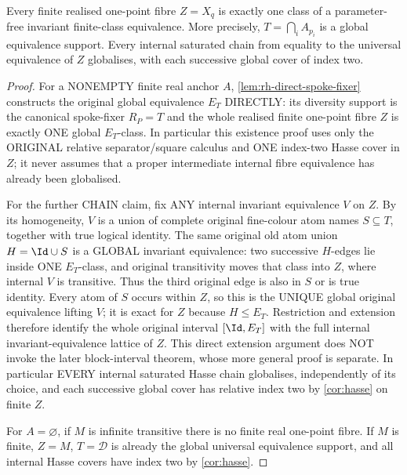 \begin{theorem}\label{thm:rh-globalise}
Every finite realised one-point fibre $Z=X_q$ is exactly one class of
a parameter-free invariant finite-class equivalence. More precisely,
$T=\bigcap_i A_{p_i}$ is a global equivalence support. Every internal
saturated chain from equality to the universal equivalence of $Z$
globalises, with each successive global cover of index two.
\end{theorem}
\begin{proof}
For a NONEMPTY finite real anchor $A$,
\cref{lem:rh-direct-spoke-fixer}
constructs the original global
equivalence $E_T$ DIRECTLY:
its diversity support is the
canonical spoke-fixer $R_P=T$
and the whole realised finite
one-point fibre $Z$ is exactly
ONE global $E_T$-class.
In particular this existence
proof uses only the ORIGINAL
relative separator/square
calculus and ONE index-two
Hasse cover in $Z$; it never
assumes that a proper
intermediate internal fibre
equivalence has already been
globalised.

For the further CHAIN claim,
fix ANY internal invariant
equivalence $V$ on $Z$.
By its homogeneity, $V$ is a
union of complete original
fine-colour atom names
$S\subseteq T$, together
with true logical identity.
The same original old atom
union $H=\Id\cup S$ is a
GLOBAL invariant equivalence:
two successive $H$-edges
lie inside ONE $E_T$-class,
and original transitivity
moves that class into $Z$,
where internal $V$ is
transitive. Thus the third
original edge is also in
$S$ or is true identity.
Every atom of $S$ occurs
within $Z$, so this is the
UNIQUE global original
equivalence lifting $V$;
it is exact for $Z$
because $H\le E_T$.
Restriction and extension
therefore identify the
whole original interval
$[\Id,E_T]$ with the full
internal invariant-equivalence
lattice of $Z$.
This direct extension argument
does NOT invoke the later
block-interval theorem, whose
more general proof is separate.
In particular EVERY internal
saturated Hasse chain
globalises, independently
of its choice, and each
successive global cover has
relative index two by
\cref{cor:hasse} on finite $Z$.

For $A=\varnothing$, if
$M$ is infinite transitive
there is no finite
real one-point fibre.
If $M$ is finite, $Z=M$,
$T=\mathcal D$ is already
the global universal
equivalence support, and
all internal Hasse covers
have index two by
\cref{cor:hasse}.
\end{proof}


